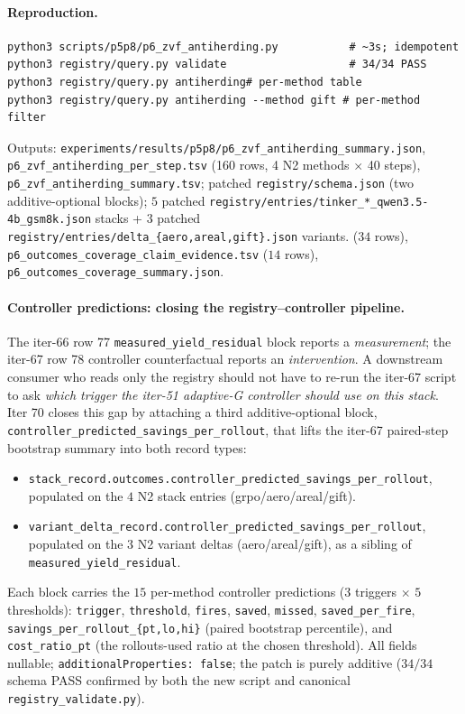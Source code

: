 \documentclass{article}
\begin{document}
\paragraph{Reproduction.}
\begin{verbatim}
python3 scripts/p5p8/p6_zvf_antiherding.py           # ~3s; idempotent
python3 registry/query.py validate                   # 34/34 PASS
python3 registry/query.py antiherding# per-method table
python3 registry/query.py antiherding --method gift # per-method filter
\end{verbatim}
Outputs: \texttt{experiments/results/p5p8/p6\_zvf\_antiherding\_summary.json},
\texttt{p6\_zvf\_antiherding\_per\_step.tsv} (160 rows, 4 N2 methods
$\times$ 40 steps), \texttt{p6\_zvf\_antiherding\_summary.tsv}; patched
\texttt{registry/schema.json} (two additive-optional blocks);
$5$ patched \texttt{registry/entries/tinker\_*\_qwen3.5-4b\_gsm8k.json}
stacks + $3$ patched \texttt{registry/entries/delta\_\{aero,areal,gift\}.json}
variants.
($34$ rows), \texttt{p6\_outcomes\_coverage\_claim\_evidence.tsv}
($14$ rows), \texttt{p6\_outcomes\_coverage\_summary.json}.
 \paragraph{Controller predictions: closing the registry--controller pipeline.}
The iter-66 row 77 \texttt{measured\_yield\_residual} block reports a
\emph{measurement}; the iter-67 row 78 controller counterfactual reports an
\emph{intervention}. A downstream consumer who reads only the registry should
not have to re-run the iter-67 script to ask \emph{which trigger the iter-51
adaptive-G controller should use on this stack}. Iter 70 closes this gap by
attaching a third additive-optional block,
\texttt{controller\_predicted\_savings\_per\_rollout}, that lifts the iter-67
paired-step bootstrap summary into both record types:
\begin{itemize}
  \item \texttt{stack\_record.outcomes.controller\_predicted\_savings\_per\_rollout},
        populated on the $4$ N2 stack entries (grpo/aero/areal/gift).
  \item \texttt{variant\_delta\_record.controller\_predicted\_savings\_per\_rollout},
        populated on the $3$ N2 variant deltas (aero/areal/gift), as a sibling
        of \texttt{measured\_yield\_residual}.
\end{itemize}
Each block carries the $15$ per-method controller predictions ($3$ triggers
$\times$ $5$ thresholds): \texttt{trigger}, \texttt{threshold}, \texttt{fires},
\texttt{saved}, \texttt{missed}, \texttt{saved\_per\_fire},
\texttt{savings\_per\_rollout\_\{pt,lo,hi\}} (paired bootstrap percentile),
and \texttt{cost\_ratio\_pt} (the rollouts-used ratio at the chosen
threshold). All fields nullable; \texttt{additionalProperties: false}; the
patch is purely additive ($34/34$ schema PASS confirmed by both the new
script and canonical \texttt{registry\_validate.py}).
\end{document}
